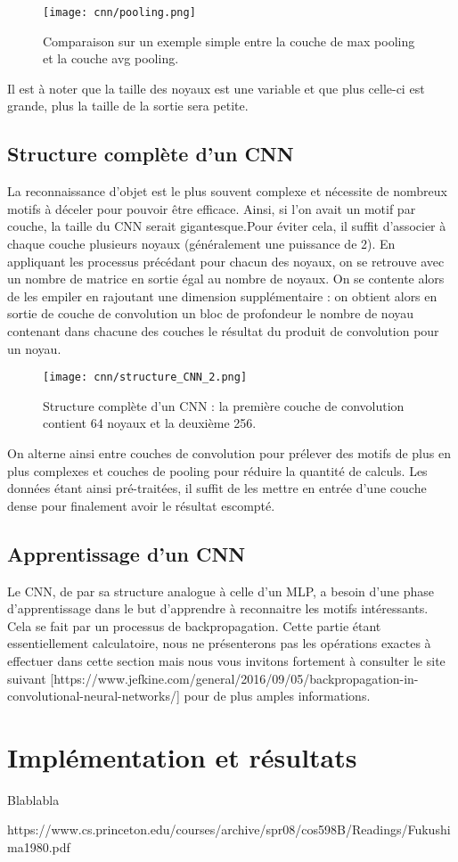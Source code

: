 \begin{figure}[!h]
\centering
\texttt{[image: cnn/pooling.png]}
\caption{Comparaison sur un exemple simple entre la couche de max pooling et la couche avg pooling.}
\end{figure}

Il est à noter que la taille des noyaux est une variable et que plus celle-ci est grande, plus la taille de la sortie sera petite. 
\subsection{Structure complète d'un CNN}

La reconnaissance d'objet est le plus souvent complexe et nécessite de nombreux motifs à déceler pour pouvoir être efficace. Ainsi, si l'on avait un motif par couche, la taille du CNN serait gigantesque.Pour éviter cela, il suffit d'associer à chaque couche plusieurs noyaux (généralement une puissance de 2). En appliquant les processus précédant pour chacun des noyaux, on se retrouve avec un nombre de matrice en sortie égal au nombre de noyaux. On se contente alors de les empiler en rajoutant une dimension supplémentaire : on obtient alors en sortie de couche de convolution un bloc de profondeur le nombre de noyau contenant dans chacune des couches  le résultat du produit de convolution pour un noyau. 

\begin{figure}[!h]
\centering
\texttt{[image: cnn/structure\_CNN\_2.png]}
\caption{Structure complète d'un CNN : la première couche de convolution contient 64 noyaux et la deuxième 256.}
\end{figure}

On alterne ainsi entre couches de convolution pour prélever des motifs de plus en plus complexes et couches de pooling pour réduire la quantité de calculs. Les données étant ainsi pré-traitées, il suffit de les mettre en entrée d'une couche dense pour finalement avoir le résultat escompté.

\subsection{Apprentissage d'un CNN}

Le CNN, de par sa structure analogue à celle d'un MLP, a besoin d'une phase d'apprentissage dans le but d'apprendre à reconnaitre les motifs intéressants. Cela se fait par un processus de backpropagation. Cette partie étant essentiellement calculatoire, nous ne présenterons pas les opérations exactes à effectuer dans cette section mais nous vous invitons fortement à consulter le site suivant [https://www.jefkine.com/general/2016/09/05/backpropagation-in-convolutional-neural-networks/] pour de plus amples informations.
 
\section{Implémentation et résultats}
Blablabla


https://www.cs.princeton.edu/courses/archive/spr08/cos598B/Readings/Fukushima1980.pdf

